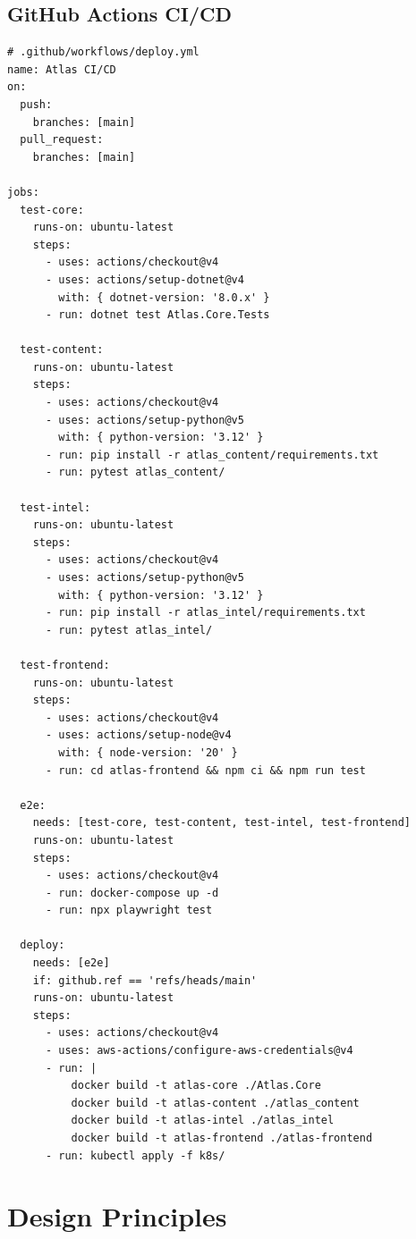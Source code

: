 \documentclass[12pt,letterpaper]{article}
\begin{document}
\subsection{GitHub Actions CI/CD}
\begin{lstlisting}[style=code]
# .github/workflows/deploy.yml
name: Atlas CI/CD
on:
  push:
    branches: [main]
  pull_request:
    branches: [main]

jobs:
  test-core:
    runs-on: ubuntu-latest
    steps:
      - uses: actions/checkout@v4
      - uses: actions/setup-dotnet@v4
        with: { dotnet-version: '8.0.x' }
      - run: dotnet test Atlas.Core.Tests

  test-content:
    runs-on: ubuntu-latest
    steps:
      - uses: actions/checkout@v4
      - uses: actions/setup-python@v5
        with: { python-version: '3.12' }
      - run: pip install -r atlas_content/requirements.txt
      - run: pytest atlas_content/

  test-intel:
    runs-on: ubuntu-latest
    steps:
      - uses: actions/checkout@v4
      - uses: actions/setup-python@v5
        with: { python-version: '3.12' }
      - run: pip install -r atlas_intel/requirements.txt
      - run: pytest atlas_intel/

  test-frontend:
    runs-on: ubuntu-latest
    steps:
      - uses: actions/checkout@v4
      - uses: actions/setup-node@v4
        with: { node-version: '20' }
      - run: cd atlas-frontend && npm ci && npm run test

  e2e:
    needs: [test-core, test-content, test-intel, test-frontend]
    runs-on: ubuntu-latest
    steps:
      - uses: actions/checkout@v4
      - run: docker-compose up -d
      - run: npx playwright test

  deploy:
    needs: [e2e]
    if: github.ref == 'refs/heads/main'
    runs-on: ubuntu-latest
    steps:
      - uses: actions/checkout@v4
      - uses: aws-actions/configure-aws-credentials@v4
      - run: |
          docker build -t atlas-core ./Atlas.Core
          docker build -t atlas-content ./atlas_content
          docker build -t atlas-intel ./atlas_intel
          docker build -t atlas-frontend ./atlas-frontend
      - run: kubectl apply -f k8s/
\end{lstlisting}

\newpage

\section{Design Principles}
\end{document}

